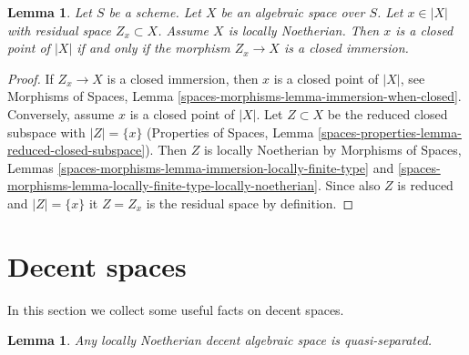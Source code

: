 \documentclass{stacks-project}
\theoremstyle{plain}
\newtheorem{lemma}[subsection]{Lemma}
\theoremstyle{definition}
\theoremstyle{remark}
\numberwithin{equation}{subsection}
\begin{document}
\begin{lemma}
\label{lemma-residual-space-closed}
Let $S$ be a scheme. Let $X$ be an algebraic space over $S$. Let $x \in |X|$
with residual space $Z_x \subset X$. Assume $X$ is locally Noetherian.
Then $x$ is a closed point of $|X|$ if and only if
the morphism $Z_x \to X$ is a closed immersion.
\end{lemma}

\begin{proof}
If $Z_x \to X$ is a closed immersion, then $x$ is a closed point of $|X|$, see
Morphisms of Spaces, Lemma \ref{spaces-morphisms-lemma-immersion-when-closed}.
Conversely, assume $x$ is a closed point of $|X|$.
Let $Z \subset X$ be the reduced closed subspace with $|Z| = \{x\}$
(Properties of Spaces,
Lemma \ref{spaces-properties-lemma-reduced-closed-subspace}).
Then $Z$ is locally Noetherian by Morphisms of Spaces, Lemmas
\ref{spaces-morphisms-lemma-immersion-locally-finite-type} and
\ref{spaces-morphisms-lemma-locally-finite-type-locally-noetherian}.
Since also $Z$ is reduced and $|Z| = \{x\}$ it $Z = Z_x$ is the
residual space by definition.
\end{proof}











\section{Decent spaces}
\label{section-decent}

\noindent
In this section we collect some useful facts on decent spaces.

\begin{lemma}
\label{lemma-locally-Noetherian-decent-quasi-separated}
Any locally Noetherian decent algebraic space is quasi-separated.
\end{lemma}
\end{document}
